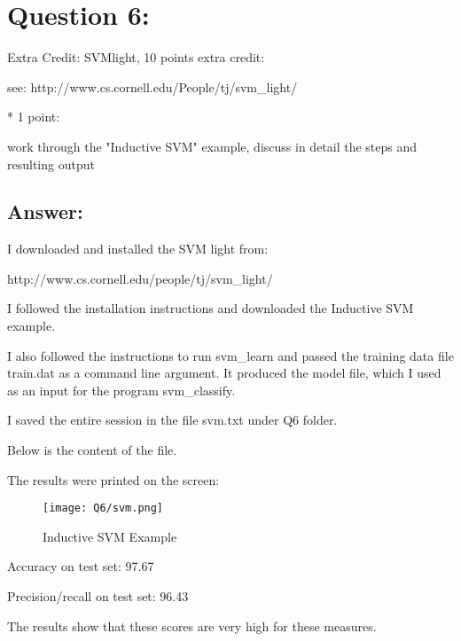 \section*{Question 6:}
Extra Credit: SVMlight, 10 points extra credit:


see: http://www.cs.cornell.edu/People/tj/svm\_light/


* 1 point:


work through the "Inductive SVM" example, discuss in detail the steps and resulting output

\subsection*{Answer:}

I downloaded and installed the SVM light from: 

http://www.cs.cornell.edu/people/tj/svm\_light/

I followed the installation instructions and downloaded the Inductive SVM example.

I also followed the instructions to run svm\_learn and passed the training data file train.dat as a command line argument. It produced the model file, which I used as an input for the program svm\_classify.

I saved the entire session in the file svm.txt under Q6 folder. 

Below is the content of the file. 



The results were printed on the screen:

\begin{figure}[h]
\caption{Inductive SVM Example}
\centering
\texttt{[image: Q6/svm.png]}
\end{figure}

Accuracy on test set: 97.67%

Precision/recall on test set: 96.43%

The results show that these scores are very high for these measures.